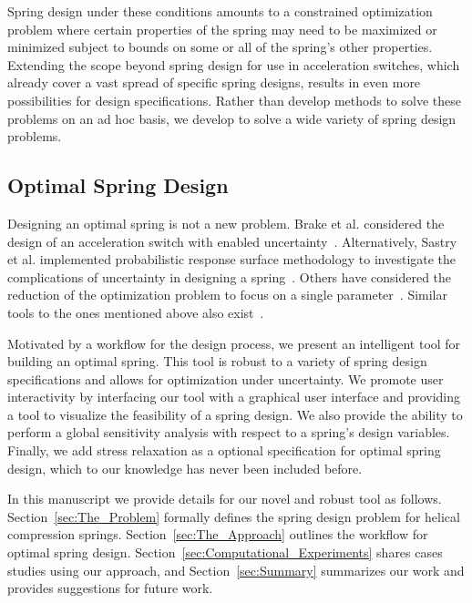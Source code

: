 \documentclass[10pt]{article}
\begin{document}
Spring design under these conditions amounts to a constrained optimization problem where certain properties of the spring may need to be maximized or minimized subject to bounds on some or all of the spring's other properties. Extending the scope beyond spring design for use in acceleration switches, which already cover a vast spread of specific spring designs, results in even more possibilities for design specifications. Rather than develop methods to solve these problems on an ad hoc basis, we develop to solve a wide variety of spring design problems. 

\subsection{Optimal Spring Design}
\label{subsec:Spring Design} 

Designing an optimal spring is not a new problem. Brake et al. considered the design of an acceleration switch with enabled uncertainty~\cite{IMSM2010}. Alternatively, Sastry et al. implemented probabilistic response surface methodology to investigate the complications of uncertainty in designing a spring~\cite{Reliability}. Others have considered the reduction of the optimization problem to focus on a single parameter~\cite{Robust}. Similar tools to the ones mentioned above also exist~\cite{Paredes}.

Motivated by a workflow for the design process, we present an intelligent tool for building an optimal spring. This tool is robust to a variety of spring design specifications and allows for optimization under uncertainty. We promote user interactivity by interfacing our tool with a graphical user interface and providing a tool to visualize the feasibility of a spring design. We also provide the ability to perform a global sensitivity analysis with respect to a spring's design variables. Finally, we add stress relaxation as a optional specification for optimal spring design, which to our knowledge has never been included before. 

In this manuscript we provide details for our novel and robust tool as follows. Section~\ref{sec:The_Problem} formally defines the spring design problem for helical compression springs. Section~\ref{sec:The_Approach} outlines the workflow for optimal spring design. Section~\ref{sec:Computational_Experiments} shares cases studies using our approach, and Section~\ref{sec:Summary} summarizes our work and provides suggestions for future work.
\end{document}
